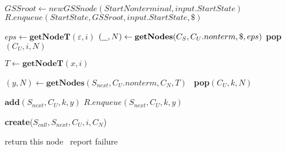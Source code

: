 \begin{algorithmic}
    \State $GSSroot\gets new GSSnode(StartNonterminal,input.StartState) $
    \State $R.enqueue(StartState, GSSroot, input.StartState, \$)$
    
    \State $eps \gets \textbf{getNodeT}(\varepsilon, i)$  
    \State $(\underline{\hspace{0.25cm}}, N) \gets \textbf{getNodes}(C_{S},C_{U}.nonterm, \$, eps)$
    \State \textbf{pop}$(C_{U},i,N)$
    \EndIf
    
            \State $T \gets \textbf{getNodeT}(x, i)$
            
            \State $(y, N) \gets \textbf{getNodes}(S_{next},C_{U}.nonterm, C_{N}, T)$
                \ \textbf{pop}$(C_{U},k,N)$ 
            \EndIf
            
            \State $\textbf{add}(S_{next}, C_{U}, k, y)$
            \Else
            \State $R.enqueue(S_{next}, C_{U}, k, y)$
            \EndIf
            \EndFor
        \EndCase
    
            \State \textbf{create}($S_{call}, S_{next}, C_{U}, i, C_{N}$)
        \EndCase
        \EndSwitch
        
    \EndFor
    \EndWhile
    \State return this node
    \Else
    \ report failure
    \EndIf
\EndFunction
\end{algorithmic}